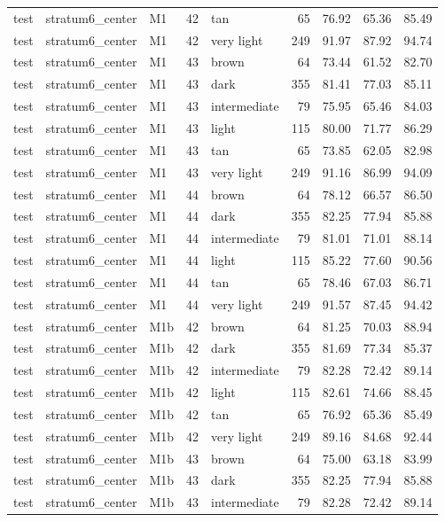 \begin{tabular}{lllrlrrrr}
test & stratum6\_center & M1 & 42 & tan & 65 & 76.92 & 65.36 & 85.49 \\
test & stratum6\_center & M1 & 42 & very light & 249 & 91.97 & 87.92 & 94.74 \\
test & stratum6\_center & M1 & 43 & brown & 64 & 73.44 & 61.52 & 82.70 \\
test & stratum6\_center & M1 & 43 & dark & 355 & 81.41 & 77.03 & 85.11 \\
test & stratum6\_center & M1 & 43 & intermediate & 79 & 75.95 & 65.46 & 84.03 \\
test & stratum6\_center & M1 & 43 & light & 115 & 80.00 & 71.77 & 86.29 \\
test & stratum6\_center & M1 & 43 & tan & 65 & 73.85 & 62.05 & 82.98 \\
test & stratum6\_center & M1 & 43 & very light & 249 & 91.16 & 86.99 & 94.09 \\
test & stratum6\_center & M1 & 44 & brown & 64 & 78.12 & 66.57 & 86.50 \\
test & stratum6\_center & M1 & 44 & dark & 355 & 82.25 & 77.94 & 85.88 \\
test & stratum6\_center & M1 & 44 & intermediate & 79 & 81.01 & 71.01 & 88.14 \\
test & stratum6\_center & M1 & 44 & light & 115 & 85.22 & 77.60 & 90.56 \\
test & stratum6\_center & M1 & 44 & tan & 65 & 78.46 & 67.03 & 86.71 \\
test & stratum6\_center & M1 & 44 & very light & 249 & 91.57 & 87.45 & 94.42 \\
test & stratum6\_center & M1b & 42 & brown & 64 & 81.25 & 70.03 & 88.94 \\
test & stratum6\_center & M1b & 42 & dark & 355 & 81.69 & 77.34 & 85.37 \\
test & stratum6\_center & M1b & 42 & intermediate & 79 & 82.28 & 72.42 & 89.14 \\
test & stratum6\_center & M1b & 42 & light & 115 & 82.61 & 74.66 & 88.45 \\
test & stratum6\_center & M1b & 42 & tan & 65 & 76.92 & 65.36 & 85.49 \\
test & stratum6\_center & M1b & 42 & very light & 249 & 89.16 & 84.68 & 92.44 \\
test & stratum6\_center & M1b & 43 & brown & 64 & 75.00 & 63.18 & 83.99 \\
test & stratum6\_center & M1b & 43 & dark & 355 & 82.25 & 77.94 & 85.88 \\
test & stratum6\_center & M1b & 43 & intermediate & 79 & 82.28 & 72.42 & 89.14 \\

\end{tabular}
